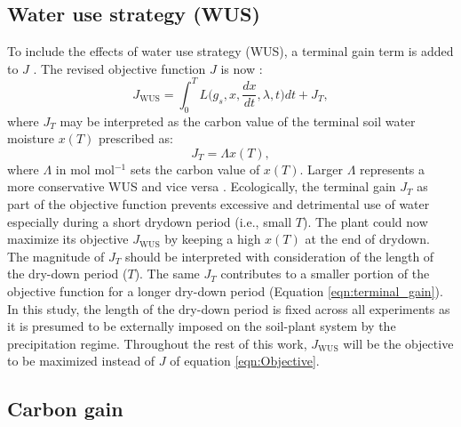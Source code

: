 \documentclass[utf8]{frontiersSCNS} %
\begin{document}
\subsection{Water use strategy (WUS)}

To include the effects of water use strategy (WUS), a terminal gain term is added to $J$ \citep{manzoni_optimization_2013}. The revised objective function $J$ is now :
\begin{equation}
    \label{eqn:Objective_WUS}
    J_{\text{WUS}} = \int_0^{T} L\Big(g_s, x, \frac{dx}{dt},\lambda,t \Big) dt + J_{T},
\end{equation}
where $J_{T}$ may be interpreted as the carbon value of the terminal soil water moisture $x(T)$ prescribed as:
\begin{equation}
    \label{eqn:terminal_gain}
    J_{T} = \Lambda x(T),
\end{equation}
where $\Lambda$ in mol mol$^{-1}$ sets the carbon value of $x(T)$. Larger $\Lambda$ represents a more conservative WUS and vice versa \citep{manzoni_optimization_2013}. Ecologically, the terminal gain $J_{T}$ as part of the objective function prevents excessive and detrimental use of water especially during a short drydown period (i.e., small $T$). The plant could now maximize its objective $J_{\text{WUS}}$ by keeping a high $x(T)$ at the end of drydown. The magnitude of $J_{T}$ should be interpreted with consideration of the length of the dry-down period ($T$). The same $J_{T}$ contributes to a smaller portion of the objective function for a longer dry-down period (Equation \ref{eqn:terminal_gain}). In this study, the length of the dry-down period is fixed across all experiments as it is presumed to be externally imposed on the soil-plant system by the precipitation regime. Throughout the rest of this work, $J_{\text{WUS}}$ will be the objective to be maximized instead of $J$ of equation \ref{eqn:Objective}.

\subsection{Carbon gain}
\end{document}
